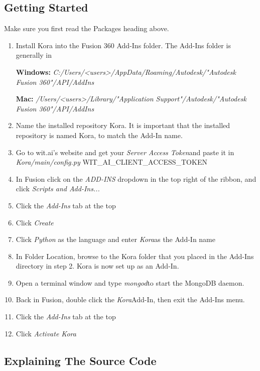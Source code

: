 \documentclass[onecolumn, draftclsnofoot,10pt, compsoc]{IEEEtran}
\begin{document}
\subsection{Getting Started}
Make sure you first read the Packages heading above.
	\begin{enumerate}
		\item Install Kora into the Fusion 360 Add-Ins folder.
		The Add-Ins folder is generally in

		\textbf{Windows:}
		\textit{C:/Users/<users>/AppData/Roaming/Autodesk/"Autodesk Fusion 360"/API/AddIns}

		\textbf{Mac:}
		\textit{/Users/<users>/Library/"Application Support"/Autodesk/"Autodesk Fusion 360"/API/AddIns}

		\item Name the installed repository Kora. It is important that the installed repository is named Kora, to match the Add-In name.
		\item  Go to wit.ai's website and get your \textit{Server Access Token}and paste it in \textit{Kora/main/config.py} WIT\_AI\_CLIENT\_ACCESS\_TOKEN
		\item  In Fusion click on the \textit{ADD-INS} dropdown in the top right of the ribbon, and click \textit{Scripts and Add-Ins...}
		\item  Click the \textit{Add-Ins} tab at the top
		\item Click \textit{Create}
		\item  Click \textit{Python} as the language and enter \textit{Kora}as the Add-In name
		\item  In Folder Location, browse to the Kora folder that you placed in the Add-Ins directory in step 2. Kora is now set up as an Add-In.
		\item  Open a terminal window and type \textit{mongod}to start the MongoDB daemon.
		\item  Back in Fusion, double click the \textit{Kora}Add-In, then exit the Add-Ins menu.
		\item  Click the \textit{Add-Ins} tab at the top
		\item  Click \textit{Activate Kora}

	\end{enumerate}





\subsection{Explaining The Source Code}
\end{document}
